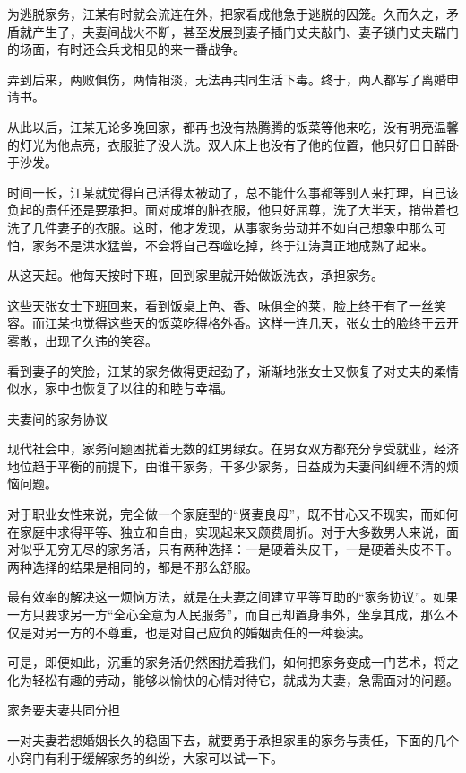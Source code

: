 \documentclass[12pt,UTF8,openany]{ctexbook}
\begin{document}
为逃脱家务，江某有时就会流连在外，把家看成他急于逃脱的囚笼。久而久之，矛盾就产生了，夫妻间战火不断，甚至发展到妻子插门丈夫敲门、妻子锁门丈夫踹门的场面，有时还会兵戈相见的来一番战争。

弄到后来，两败俱伤，两情相淡，无法再共同生活下毒。终于，两人都写了离婚申请书。

从此以后，江某无论多晚回家，都再也没有热腾腾的饭菜等他来吃，没有明亮温馨的灯光为他点亮，衣服脏了没人洗。双人床上也没有了他的位置，他只好日日醉卧于沙发。

时间一长，江某就觉得自己活得太被动了，总不能什么事都等别人来打理，自己该负起的责任还是要承担。面对成堆的脏衣服，他只好屈尊，洗了大半天，捎带着也洗了几件妻子的衣服。这时，他才发现，从事家务劳动并不如自己想象中那么可怕，家务不是洪水猛兽，不会将自己吞噬吃掉，终于江涛真正地成熟了起来。

从这天起。他每天按时下班，回到家里就开始做饭洗衣，承担家务。

这些天张女士下班回来，看到饭桌上色、香、味俱全的莱，脸上终于有了一丝笑容。而江某也觉得这些天的饭菜吃得格外香。这样一连几天，张女士的脸终于云开雾散，出现了久违的笑容。

看到妻子的笑脸，江某的家务做得更起劲了，渐渐地张女士又恢复了对丈夫的柔情似水，家中也恢复了以往的和睦与幸福。





夫妻间的家务协议


现代社会中，家务问题困扰着无数的红男绿女。在男女双方都充分享受就业，经济地位趋于平衡的前提下，由谁干家务，干多少家务，日益成为夫妻间纠缠不清的烦恼问题。

对于职业女性来说，完全做一个家庭型的“贤妻良母”，既不甘心又不现实，而如何在家庭中求得平等、独立和自由，实现起来又颇费周折。对于大多数男人来说，面对似乎无穷无尽的家务活，只有两种选择：一是硬着头皮干，一是硬着头皮不干。两种选择的结果是相同的，都是不那么舒服。

最有效率的解决这一烦恼方法，就是在夫妻之间建立平等互助的“家务协议”。如果一方只要求另一方“全心全意为人民服务”，而自己却置身事外，坐享其成，那么不仅是对另一方的不尊重，也是对自己应负的婚姻责任的一种亵渎。

可是，即便如此，沉重的家务活仍然困扰着我们，如何把家务变成一门艺术，将之化为轻松有趣的劳动，能够以愉快的心情对待它，就成为夫妻，急需面对的问题。





家务要夫妻共同分担


一对夫妻若想婚姻长久的稳固下去，就要勇于承担家里的家务与责任，下面的几个小窍门有利于缓解家务的纠纷，大家可以试一下。
\end{document}
